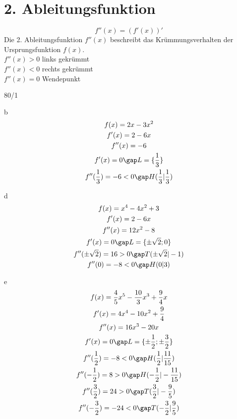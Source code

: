 \section{2. Ableitungsfunktion}
$$f''(x) = (f'(x))'$$
Die 2. Ableitungsfunktion $f''(x)$ beschreibt das Krümmungsverhalten der Ursprungsfunktion $f(x)$. \\
$f''(x) > 0$ links gekrümmt \\
$f''(x) < 0$ rechts gekrümmt \\
$f''(x) = 0$ Wendepunkt \\
\begin{exercise}{80/1}
  \item [b]
  \begin{gather*}
    f(x) = 2x - 3x^2 \\
    f'(x) = 2 - 6x \\
    f''(x) = -6 \\
    f'(x) = 0 \gap L = \{\frac{1}{3}\} \\
    f''(\frac{1}{3}) = -6 < 0 \gap H(\frac{1}{3}|\frac{1}{3})
  \end{gather*}
  \item [d]
  \begin{gather*}
    f(x) = x^4 - 4x^2 + 3 \\
    f'(x) = 2 - 6x \\
    f''(x) = 12x^2 - 8 \\
    f'(x) = 0 \gap L = \{\pm \sqrt{2}; 0\} \\
    f''(\pm \sqrt{2}) = 16 > 0 \gap T(\pm \sqrt{2}|-1) \\
    f''(0) = -8 < 0 \gap H(0|3)
  \end{gather*}
  \item [e]
  \begin{gather*}
    f(x) = \frac{4}{5}x^5 - \frac{10}{3}x^3 + \frac{9}{4}x \\
    f'(x) = 4x^4 - 10x^2 + \frac{9}{4} \\
    f''(x) = 16x^3 - 20x \\
    f'(x) = 0 \gap L = \{\pm \frac{1}{2}; \pm \frac{3}{2}\} \\
    f''(\frac{1}{2}) = -8 < 0 \gap H(\frac{1}{2}|\frac{11}{15}) \\
    f''(-\frac{1}{2}) = 8 > 0 \gap H(-\frac{1}{2}|-\frac{11}{15}) \\
    f''(\frac{3}{2}) = 24 > 0 \gap T(\frac{3}{2}|-\frac{9}{5}) \\
    f''(-\frac{3}{2}) = -24 < 0 \gap T(-\frac{3}{2}|\frac{9}{5})
  \end{gather*}
\end{exercise}

